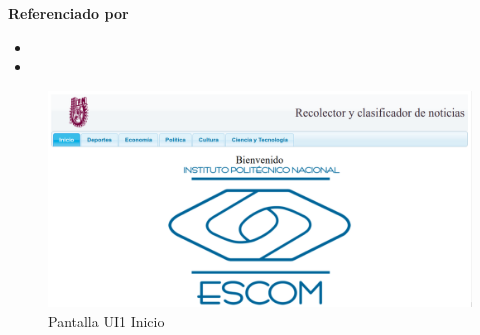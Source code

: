 \begin{large}
  \textbf{Referenciado por}
\end{large}

\begin{itemize}

  \item {}
  \item {}

\end{itemize}  


\begin{figure}
  \centering
	\includegraphics[scale=.35]{imagenes/Pantallas/UI1}
  \caption{Pantalla UI1 Inicio}
  \label{fig:UI1}
\end{figure}


